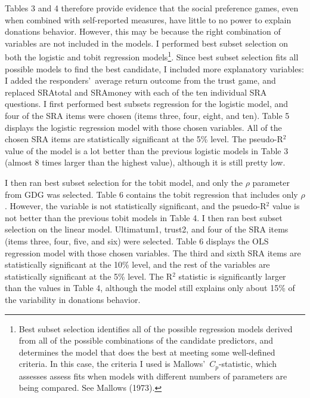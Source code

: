 \documentclass[12pt]{article}
\begin{document}
Tables 3 and 4 therefore provide evidence that the social preference games, even when combined with self-reported measures, have little to no power to explain donations behavior. However, this may be because the right combination of variables are not included in the models. I performed best subset selection on both the logistic and tobit regression models\footnote{Best subset selection identifies all of the possible regression models derived from all of the possible combinations of the candidate predictors, and determines the model that does the best at meeting some well-defined criteria. In this case, the criteria I used is Mallows\rq \ \(C_{p}\)-statistic, which assesses assess fits when models with different numbers of parameters are being compared.  See Mallows (1973).}. Since best subset selection fits all possible models to find the best candidate, I included more explanatory variables: I added the responders\rq \ average return outcome from the trust game, and replaced SRAtotal and SRAmoney with each of the ten individual SRA questions. I first performed best subsets regression for the logistic model, and four of the SRA items were chosen (items three, four, eight, and ten). Table 5 displays the logistic regression model with those chosen variables. All of the chosen SRA items are statistically significant at the 5\% level. The pseudo-R$^{2}$ value of the model is a lot better than the previous logistic models in Table 3 (almost 8 times larger than the highest value), although it is still pretty low. 

I then ran best subset selection for the tobit model, and only the \(\rho\) parameter from GDG was selected. Table 6 contains the tobit regression that includes only \(\rho\). However, the variable is not statistically significant, and the psuedo-R$^{2}$ value is not better than the previous tobit models in Table 4. {\color{blue} I then ran best subset selection on the linear model. Ultimatum1, trust2, and four of the SRA items (items three, four, five, and six) were selected. Table 6 displays the OLS regression model with those chosen variables. The third and sixth SRA items are statistically significant at the 10\% level, and the rest of the variables are statistically significant at the 5\% level. The R$^{2}$ statistic is significantly larger than the values in Table 4, although the model still explains only about 15\% of the variability in donations behavior.}
\end{document}
